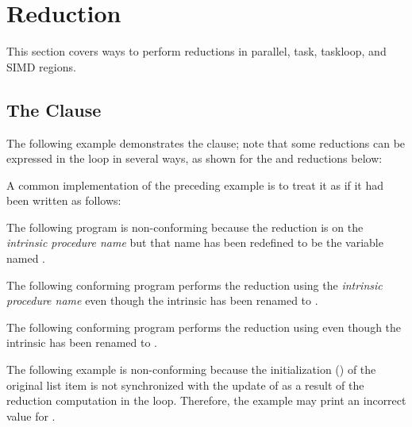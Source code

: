 \pagebreak

\section{Reduction}
\label{sec:reduction}

This section covers ways to perform reductions in parallel, task, taskloop, and SIMD regions.

\subsection{The  Clause}
\label{subsec:reduction}

The following example demonstrates the  clause; note that some 
reductions can be expressed in the loop in several ways, as shown for the  
and  reductions below:


\pagebreak


A common implementation of the preceding example is to treat it as if it had been 
written as follows:


\fortranspecificstart
{}

The following program is non-conforming because the reduction is on the 
\emph{intrinsic procedure name}  but that name has been redefined to be the variable 
named .

\begin{figure}[t!]
\end{figure}

The following conforming program performs the reduction using the 
\emph{intrinsic procedure name}  even though the intrinsic  has been renamed 
to .


The following conforming program performs the reduction using 
  even though the intrinsic  has been renamed 
to .

\fortranspecificend

\pagebreak
The following example is non-conforming because the initialization () of the original list item  is not synchronized with the update of 
 as a result of the reduction computation in the  loop. Therefore, 
the example may print an incorrect value for .


